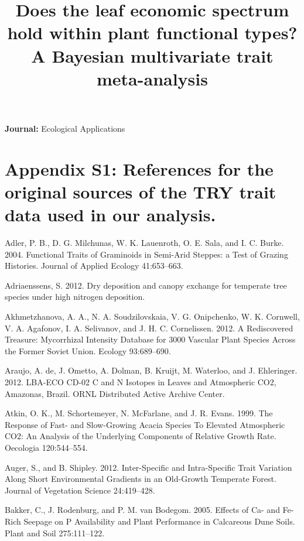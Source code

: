 \documentclass[11pt]{article}
\date{}
\title{Does the leaf economic spectrum hold within plant functional types? A Bayesian multivariate trait meta-analysis}
\begin{document}
\maketitle
\noindent \textbf{Journal:} Ecological Applications

\clearpage

\section*{Appendix S1: References for the original sources of the TRY trait data used in our analysis.}

\begin{hangparas}{1.5em}{1}\hypertarget{citeproc_bib_item_1}{Adler, P. B., D. G. Milchunas, W. K. Lauenroth, O. E. Sala, and I. C. Burke. 2004. Functional Traits of Graminoids in Semi-Arid Steppes: a Test of Grazing Histories. Journal of Applied Ecology 41:653–663.}

\hypertarget{citeproc_bib_item_2}{Adriaenssens, S. 2012. Dry deposition and canopy exchange for temperate tree species under high nitrogen deposition.}

\hypertarget{citeproc_bib_item_3}{Akhmetzhanova, A. A., N. A. Soudzilovskaia, V. G. Onipchenko, W. K. Cornwell, V. A. Agafonov, I. A. Selivanov, and J. H. C. Cornelissen. 2012. A Rediscovered Treasure: Mycorrhizal Intensity Database for 3000 Vascular Plant Species Across the Former Soviet Union. Ecology 93:689–690.}

\hypertarget{citeproc_bib_item_4}{Araujo, A. de, J. Ometto, A. Dolman, B. Kruijt, M. Waterloo, and J. Ehleringer. 2012. LBA-ECO CD-02 C and N Isotopes in Leaves and Atmospheric CO2, Amazonas, Brazil. ORNL Distributed Active Archive Center.}

\hypertarget{citeproc_bib_item_5}{Atkin, O. K., M. Schortemeyer, N. McFarlane, and J. R. Evans. 1999. The Response of Fast- and Slow-Growing Acacia Species To Elevated Atmospheric CO2: An Analysis of the Underlying Components of Relative Growth Rate. Oecologia 120:544–554.}

\hypertarget{citeproc_bib_item_6}{Auger, S., and B. Shipley. 2012. Inter-Specific and Intra-Specific Trait Variation Along Short Environmental Gradients in an Old-Growth Temperate Forest. Journal of Vegetation Science 24:419–428.}

\hypertarget{citeproc_bib_item_7}{Bakker, C., J. Rodenburg, and P. M. van Bodegom. 2005. Effects of Ca- and Fe-Rich Seepage on P Availability and Plant Performance in Calcareous Dune Soils. Plant and Soil 275:111–122.}


\end{hangparas}
\end{document}
